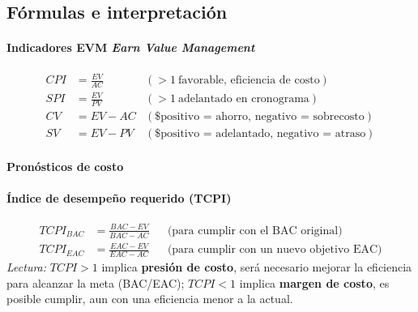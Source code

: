 \documentclass[12pt]
{charter}
\begin{document}
\FloatBarrier

\subsection*{Fórmulas e interpretación}

\paragraph{Indicadores EVM \textit{Earn Value Management}}
\[
\begin{aligned}
CPI &= \frac{EV}{AC} \quad & (>1\ \text{favorable, eficiencia de costo})\\
SPI &= \frac{EV}{PV} \quad & (>1\ \text{adelantado en cronograma})\\[2pt]
CV  &= EV - AC              & (\text{\$ positivo = ahorro, negativo = sobrecosto})\\
SV  &= EV - PV              & (\text{\$ positivo = adelantado, negativo = atraso})
\end{aligned}
\]

\paragraph{Pronósticos de costo}
\begin{table}[h]
\centering
{}
\end{table}


\paragraph{Índice de desempeño requerido (TCPI)}
\[
\begin{aligned}
TCPI_{BAC} &= \frac{BAC - EV}{BAC - AC}
&& \text{(para cumplir con el BAC original)}\\
TCPI_{EAC} &= \frac{EAC - EV}{EAC - AC}
&& \text{(para cumplir con un nuevo objetivo EAC)}
\end{aligned}
\]
\textit{Lectura:} $TCPI>1$ implica \textbf{presión de costo}, será necesario mejorar la eficiencia para alcanzar la meta (BAC/EAC); $TCPI<1$ implica \textbf{margen de costo}, es posible cumplir, aun con una eficiencia menor a la actual.
\end{document}
